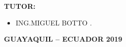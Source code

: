 \documentclass[12pt]{article}
\renewcommand{\_}{\kern-1.5pt\textunderscore\kern-1.5pt}
\begin{document}
\vspace{\baselineskip}

\vspace{\baselineskip}
\begin{Center}
\textbf{TUTOR:}
\end{Center}\par

\begin{itemize}
	\item ING.MIGUEL BOTTO .
\end{itemize}\par


\vspace{\baselineskip}
\begin{Center}
\textbf{GUAYAQUIL – ECUADOR 2019}
\end{Center}\par




\newpage

\vspace{\baselineskip}
\vspace{\baselineskip}

\vspace{\baselineskip}

\printbibliography
\end{document}
